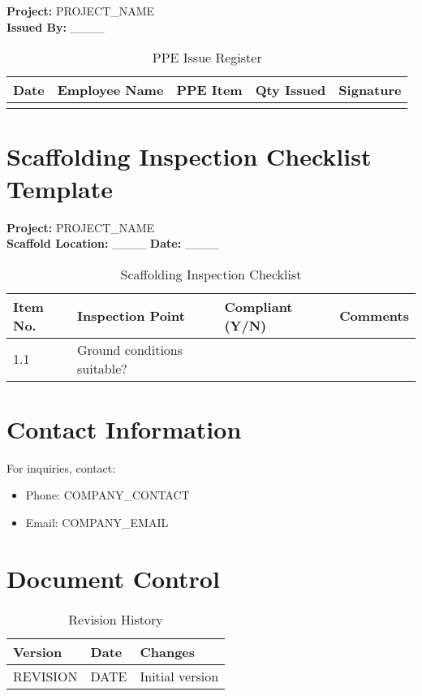 \documentclass[12pt]{article}
\begin{document}
\textbf{Project:} {{PROJECT_NAME}}\\
\textbf{Issued By:} \_\_\_\_

\begin{table}[h]
    \centering
    \begin{tabular}{p{2cm}p{3cm}p{3cm}p{3cm}p{3cm}}
        \toprule
        \textbf{Date} & \textbf{Employee Name} & \textbf{PPE Item} & \textbf{Qty Issued} & \textbf{Signature} \\
        \midrule
        & & & & \\
        \bottomrule
    \end{tabular}
    \caption{PPE Issue Register}
\end{table}

\section{Scaffolding Inspection Checklist Template}

\textbf{Project:} {{PROJECT_NAME}}\\
\textbf{Scaffold Location:} \_\_\_\_ \textbf{Date:} \_\_\_\_

\begin{table}[h]
    \centering
    \begin{tabular}{p{3cm}p{6cm}p{2cm}p{3cm}}
        \toprule
        \textbf{Item No.} & \textbf{Inspection Point} & \textbf{Compliant (Y/N)} & \textbf{Comments} \\
        \midrule
        1.1 & Ground conditions suitable? & & \\
        \bottomrule
    \end{tabular}
    \caption{Scaffolding Inspection Checklist}
\end{table}

\section{Contact Information}
For inquiries, contact:
\begin{itemize}
    \item Phone: {{COMPANY_CONTACT}}
    \item Email: {{COMPANY_EMAIL}}
\end{itemize}

\section{Document Control}
\begin{table}[h]
    \centering
    \begin{tabular}{p{3cm}p{3cm}p{6cm}}
        \toprule
        \textbf{Version} & \textbf{Date} & \textbf{Changes} \\
        \midrule
        {{REVISION}} & {{DATE}} & Initial version \\
        \bottomrule
    \end{tabular}
    \caption{Revision History}
\end{table}
\end{document}
